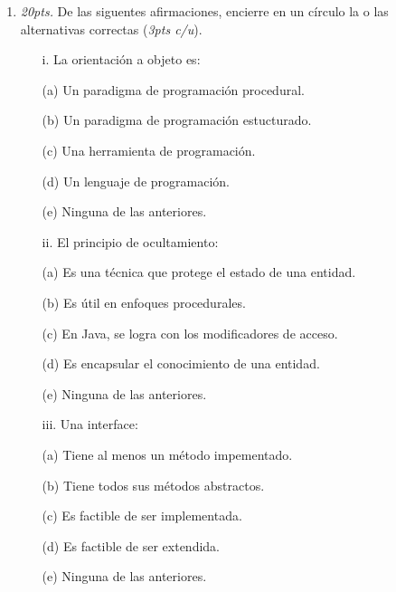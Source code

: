 \documentclass[10pt]{article}
\begin{document}
\begin{enumerate}

    \item \emph{20pts.} De las siguentes afirmaciones, encierre en un c\'irculo la o las alternativas correctas (\emph{3pts c/u}).    

	{\footnotesize
    
    \begin{multicols}{2}

	\begin{enumerate}[label=(\alph*)]
        \item[i.] La orientaci\'on a objeto es: 
        \item[(a)] Un paradigma de programaci\'on procedural.
        \item[(b)] Un paradigma de programaci\'on estucturado.
        \item[(c)] Una herramienta de programaci\'on.
        \item[(d)] Un lenguaje de programaci\'on.
        \item[(e)] Ninguna de las anteriores.
    \end{enumerate}

    \begin{enumerate}[label=(\alph*)]
        \item[ii.] El principio de ocultamiento: 
        \item[(a)] Es una t\'ecnica que protege el estado de una entidad.
        \item[(b)] Es \'util en enfoques procedurales.
        \item[(c)] En Java, se logra con los modificadores de acceso.
        \item[(d)] Es encapsular el conocimiento de una entidad.
        \item[(e)] Ninguna de las anteriores.
    \end{enumerate}

    \begin{enumerate}[label=(\alph*)]
        \item[iii.] Una interface:
        \item[(a)] Tiene al menos un m\'etodo impementado.
        \item[(b)] Tiene todos sus m\'etodos abstractos.
        \item[(c)] Es factible de ser implementada.
        \item[(d)] Es factible de ser extendida.
        \item[(e)] Ninguna de las anteriores.
    \end{enumerate}


\end{multicols}}
\end{enumerate}
\end{document}
